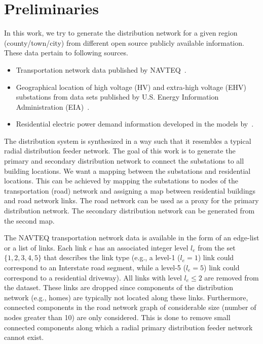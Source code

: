 \section{Preliminaries}\label{sec:prelim}
In this work, we try to generate the distribution network for a given region (county/town/city) from different open source publicly available information. These data pertain to following sources.
\begin{itemize}
	\item Transportation network data published by NAVTEQ~\cite{navteq}.
	\item Geographical location of high voltage (HV) and extra-high voltage (EHV) substations from data sets published by U.S. Energy Information Administration (EIA)~\cite{eia_substations}.
	\item Residential electric power demand information developed in the models by~\cite{swapna_2018}.
\end{itemize}
The distribution system is synthesized in a way such that it resembles a typical radial distribution feeder network. The goal of this work is to generate the primary and secondary distribution network to connect the substations to all building locations. We want a mapping between the substations and residential locations. This can be achieved by mapping the substations to nodes of the transportation (road) network and assigning a map between residential buildings and road network links. The road network can be used as a proxy for the primary distribution network. The secondary distribution network can be generated from the second map.

The NAVTEQ transportation network data is available in the form of an edge-list or a list of links. Each link $e$ has an associated integer level $l_e$ from the set $\{1,2,3,4,5\}$ that describes the link type (e.g., a level-1 ($l_e=1$) link could correspond to an Interstate road segment, while a level-5 ($l_e=5$) link could correspond to a residential driveway). All links with level $l_e\leq2$ are removed from the dataset. These links are dropped since	components of the distribution network (e.g., homes) are typically not located along these links. Furthermore, connected components in the road network graph of considerable size (number of nodes greater than 10) are only considered. This is done to remove small connected components along which a radial primary distribution feeder network cannot exist.

